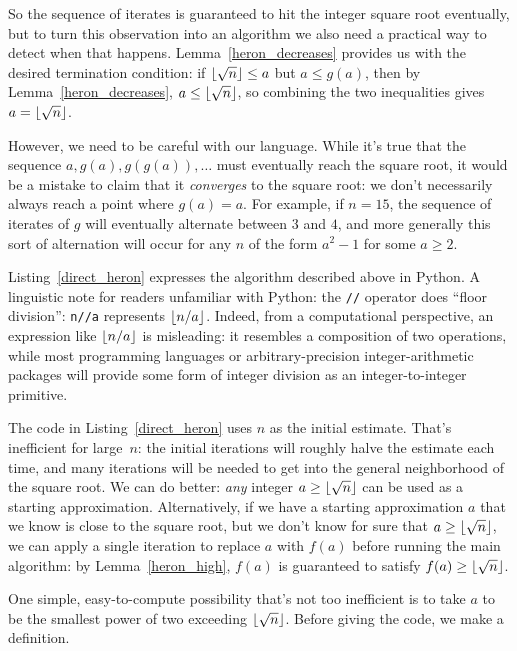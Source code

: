 \documentclass[a4paper]{article}
\DeclarePairedDelimiter\floor{\lfloor}{\rfloor}
\theoremstyle{plain}
\theoremstyle{definition}
\begin{document}
So the sequence of iterates is guaranteed to hit the integer square root
eventually, but to turn this observation into an algorithm we also need a
practical way to detect when that happens. Lemma~\ref{heron_decreases} provides
us with the desired termination condition: if $\floor{\sqrt n} \le a$ but $a \le
g(a)$, then by Lemma~\ref{heron_decreases}, $a \le \floor{\sqrt n}$, so
combining the two inequalities gives $a = \floor{\sqrt n}$.

However, we need to be careful with our language. While it's
true that the sequence $a, g(a), g(g(a)), \dots$ must eventually reach the
square root, it would be a mistake to claim that it \emph{converges} to the
square root: we don't necessarily always reach a point where $g(a) = a$. For
example, if $n=15$, the sequence of iterates of $g$ will eventually alternate
between $3$ and $4$, and more generally this sort of alternation will occur for
any $n$ of the form $a^2 - 1$ for some $a \ge 2$.

Listing~\ref{direct_heron} expresses the algorithm described above in Python. A
linguistic note for readers unfamiliar with Python: the \lstinline$//$ operator
does ``floor division'': \lstinline$n//a$ represents $\floor{n / a}$. Indeed,
from a computational perspective, an expression like $\floor{n / a}$ is
misleading: it resembles a composition of two operations, while most
programming languages or arbitrary-precision integer-arithmetic packages will
provide some form of integer division as an integer-to-integer primitive.



The code in Listing~\ref{direct_heron} uses $n$ as the initial estimate. That's
inefficient for large~$n$: the initial iterations will roughly halve the
estimate each time, and many iterations will be needed to get into the general
neighborhood of the square root. We can do better: \emph{any} integer $a \ge
\floor{\sqrt n}$ can be used as a starting approximation. Alternatively, if we
have a starting approximation $a$ that we know is close to the square root, but
we don't know for sure that $a \ge \floor{\sqrt n}$, we can apply a single
iteration to replace $a$ with $f(a)$ before running the main algorithm: by
Lemma~\ref{heron_high}, $f(a)$ is guaranteed to satisfy $f(a) \ge \floor{\sqrt
n}$.

One simple, easy-to-compute possibility that's not too inefficient is to take
$a$ to be the smallest power of two exceeding $\floor{\sqrt n}$. Before giving
the code, we make a definition.
\end{document}
